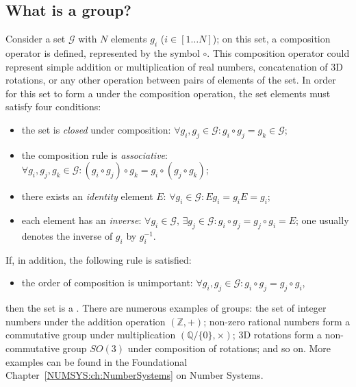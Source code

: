 \subsection{What is a group?}\label{\chabbr:ssec:groupdef}
Consider a set $\mathcal{G}$ with $N$ elements $g_i$ ($i\in[1\ldots N]$); on this set, a composition operator is defined, represented by the symbol $\circ$.  This composition operator could represent simple addition or multiplication of real numbers, concatenation of 3D rotations, or any other operation between pairs of elements of the set.  In order for this set to form a  under the  composition operation, the set elements must satisfy four conditions:
\begin{itemize}
	\item the set is \textit{closed} under composition: $\forall g_i,g_j\in\mathcal{G}: g_i\circ g_j = g_k\in\mathcal{G}$;
	\item the composition rule is \textit{associative}: $\forall g_i,g_j,g_k\in\mathcal{G}: (g_i\circ g_j)\circ g_k = g_i\circ(g_j\circ g_k)$;
	\item there exists an \textit{identity} element $E$: $\forall g_i\in\mathcal{G}: Eg_i=g_i E=g_i$;
	\item each element has an \textit{inverse}: $\forall g_i\in\mathcal{G},\, \exists g_j\in\mathcal{G}: g_i\circ g_j=g_j\circ g_i=E$; one usually denotes the inverse of $g_i$ by $g_i^{-1}$.
\end{itemize}
If, in addition, the following rule is satisfied:
\begin{itemize}
	\item the order of composition is unimportant: $\forall g_i,g_j\in\mathcal{G}: g_i\circ g_j = g_j\circ g_i$,
\end{itemize}
then the set is a .  There are numerous examples of groups: the set of integer numbers under the addition operation $(\mathbb{Z},+)$; non-zero rational numbers form a commutative group under multiplication $(\mathbb{Q}/\{0\}, \times)$; 3D rotations form a non-commutative group $SO(3)$ under composition of rotations; and so on.  More examples can be found in the Foundational Chapter~\ref{NUMSYS:ch:NumberSystems} on Number Systems.  

